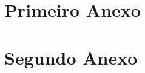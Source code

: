 \documentclass[portuguese]{ist-thesis}
\begin{document}
\printbibliography[heading = bibintoc]

\appendix

\chapter{Primeiro Anexo}

\lipsum

\chapter{Segundo Anexo}

\lipsum

\makespine
\end{document}
